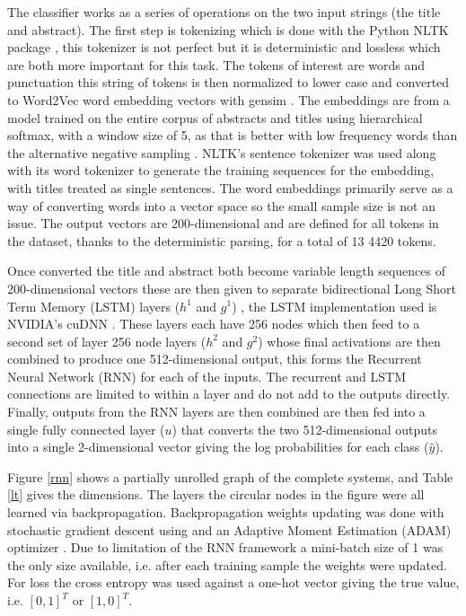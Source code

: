 \documentclass[12pt, a4paper]{article}
\begin{document}
The classifier works as a series of operations on the two input strings (the title and abstract). The first step is tokenizing which is done with the Python NLTK package \citep{Loper:2002:NNL:1118108.1118117}, this tokenizer is not perfect but it is deterministic and lossless which are both more important for this task. The tokens of interest are words and punctuation this string of tokens is then normalized to lower case and converted to Word2Vec \citep{mikolov2013efficient} word embedding vectors with gensim \citep{rehurek_lrec}. The embeddings are from a model trained on the entire corpus of abstracts and titles using  hierarchical softmax, with a window size of 5, as that is better with low frequency words\citep{mikolov2013efficient} than the alternative negative sampling \citep{mikolov2013distributed}. NLTK's sentence tokenizer was used along with its word tokenizer to generate the training sequences for the embedding, with titles treated as single sentences. The word embeddings primarily serve as a way of converting words into a vector space so the small sample size is not an issue. The output vectors are 200-dimensional and are defined for all tokens in the dataset, thanks to the deterministic parsing, for a total of 13 4420 tokens.

Once converted the title and abstract both become variable length sequences of 200-dimensional vectors these are then given to separate bidirectional \citep{graves2013hybrid} Long Short Term Memory (LSTM) layers ($h^1$ and $g^1$) \citep{Hochreiter:1997:LSM:1246443.1246450}, the LSTM implementation used is NVIDIA's cuDNN \citep{chetlur2014cudnn}. These layers each have 256 nodes which then feed to a second set of layer 256 node layers ($h^2$ and $g^2$) whose final activations are then combined to produce one 512-dimensional output, this forms the Recurrent Neural Network (RNN) for each of the inputs. The recurrent and LSTM connections are limited to within a layer and do not add to the outputs directly. Finally, outputs from the RNN layers are then combined are then fed into a single fully connected layer ($u$) that converts the two 512-dimensional outputs into a single 2-dimensional vector giving the log probabilities for each class ($\hat{y}$).

Figure \ref{rnn} shows a partially unrolled graph of the complete systems, and Table \ref{lt} gives the dimensions. The layers the circular nodes in the figure were all learned via backpropagation. Backpropagation weights updating was done with stochastic gradient descent using and an Adaptive Moment Estimation (ADAM) optimizer \citep{kingma2014adam}. Due to limitation of the RNN framework a mini-batch size of 1 was the only size available, i.e. after each training sample the weights were updated. For loss the cross entropy was used against a one-hot vector giving the true value, i.e. $[0, 1]^T$ or $[1, 0]^T$.
\end{document}
